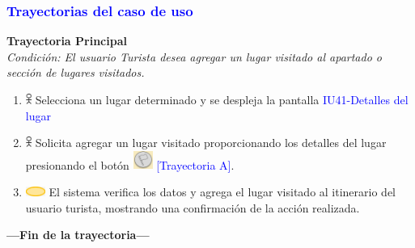 \subsubsection{\textcolor{blue}{Trayectorias del caso de uso}}

\textbf{Trayectoria Principal}\\
\textit{Condición: El usuario Turista desea agregar un lugar visitado al apartado o sección 
 de lugares visitados.}
\begin{enumerate}
    \item \includegraphics[width=0.0150\textwidth]{Figuras/persona.png} Selecciona un lugar determinado y se despleja la pantalla {\textcolor{blue}{IU41-Detalles del lugar}}
    \item \includegraphics[width=0.0150\textwidth]{Figuras/persona.png} Solicita agregar un lugar visitado proporcionando los detalles del lugar presionando el botón \includegraphics[width=0.0500\textwidth]{ComponentesCU/MarcarVisitado.PNG} {\textcolor{blue}{[Trayectoria A]}}.
    \item \includegraphics[width=0.0500\textwidth]{Figuras/sistema.png} El sistema verifica los datos y agrega el lugar visitado al itinerario del usuario turista, mostrando una confirmación de la acción realizada.
\end{enumerate}
\textbf{---Fin de la trayectoria---}
\vspace{15pt}

